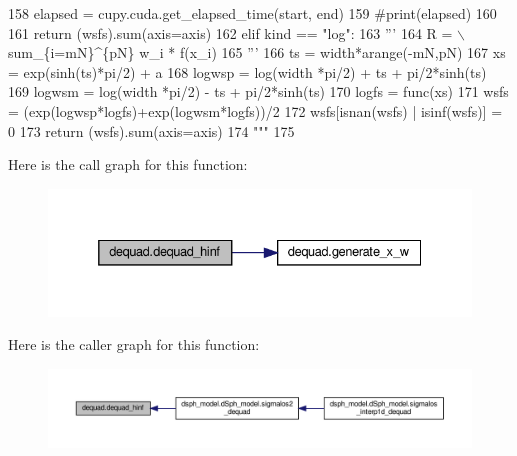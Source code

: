 \begin{DoxyCode}
158 \textcolor{stringliteral}{        elapsed = cupy.cuda.get\_elapsed\_time(start, end)}
159 \textcolor{stringliteral}{        #print(elapsed)}
160 \textcolor{stringliteral}{                }
161 \textcolor{stringliteral}{        return (wsfs).sum(axis=axis)}
162 \textcolor{stringliteral}{    elif kind == "log":}
163 \textcolor{stringliteral}{        '''}
164 \textcolor{stringliteral}{        R = \(\backslash\)sum\_\{i=mN\}^\{pN\} w\_i * f(x\_i)}
165 \textcolor{stringliteral}{        '''}
166 \textcolor{stringliteral}{        ts = width*arange(-mN,pN)}
167 \textcolor{stringliteral}{        xs = exp(sinh(ts)*pi/2) + a}
168 \textcolor{stringliteral}{        logwsp = log(width *pi/2) + ts + pi/2*sinh(ts)}
169 \textcolor{stringliteral}{        logwsm = log(width *pi/2) - ts + pi/2*sinh(ts)}
170 \textcolor{stringliteral}{        logfs = func(xs)}
171 \textcolor{stringliteral}{        wsfs = (exp(logwsp*logfs)+exp(logwsm*logfs))/2}
172 \textcolor{stringliteral}{        wsfs[isnan(wsfs) | isinf(wsfs)] = 0}
173 \textcolor{stringliteral}{        return (wsfs).sum(axis=axis)}
174 \textcolor{stringliteral}{"""}
175 \end{DoxyCode}
Here is the call graph for this function\+:\nopagebreak
\begin{figure}[H]
\begin{center}
\leavevmode
\includegraphics[width=332pt]{da/dfc/namespacedequad_a2654bb61f33ab8685320882396c81ae0_cgraph}
\end{center}
\end{figure}
Here is the caller graph for this function\+:\nopagebreak
\begin{figure}[H]
\begin{center}
\leavevmode
\includegraphics[width=350pt]{da/dfc/namespacedequad_a2654bb61f33ab8685320882396c81ae0_icgraph}
\end{center}
\end{figure}
\mbox{\label{namespacedequad_a0774348e796cb0945f2e0b0a7fa1c1e9}} 

